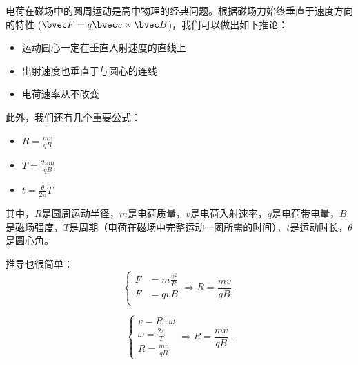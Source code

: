 
电荷在磁场中的圆周运动是高中物理的经典问题。根据磁场力始终垂直于速度方向的特性 ($\bvec F = q\bvec v \times \bvec B$)，我们可以做出如下推论：
\begin{itemize}
\item 运动圆心一定在垂直入射速度的直线上
\item 出射速度也垂直于与圆心的连线
\item 电荷速率从不改变
\end{itemize}

此外，我们还有几个重要公式：
\begin{itemize}
\item $R=\frac{mv}{qB}$
\item $T=\frac{2\pi m}{qB}$
\item $t = \frac{\theta}{2\pi} T$
\end{itemize}
其中，$R$是圆周运动半径，$m$是电荷质量，$v$是电荷入射速率，$q$是电荷带电量，$B$是磁场强度，$T$是周期（电荷在磁场中完整运动一圈所需的时间），$t$是运动时长，$\theta$是圆心角。

推导也很简单：
$$
\left \{
\begin{aligned}
F&=m\frac{v^2}{R}\\
F&=qvB\\
\end{aligned}
\Rightarrow
R=\frac{mv}{qB}
\right.
~.
$$

$$
\left \{
\begin{aligned}
v=R\cdot\omega\\
\omega = \frac{2\pi}{T}\\
R=\frac{mv}{qB}
\end{aligned}
\Rightarrow
R=\frac{mv}{qB}
\right.
~.
$$